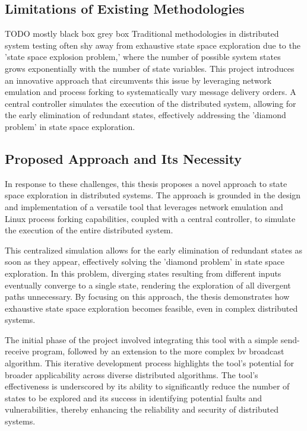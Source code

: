 \documentclass[a4paper,11pt,oneside]{report}
\begin{document}
\subsection{Limitations of Existing Methodologies}
TODO mostly black box grey box
Traditional methodologies in distributed system testing often shy away from exhaustive state space exploration due to the 'state space explosion problem,' where the number of possible system states grows exponentially with the number of state variables. This project introduces an innovative approach that circumvents this issue by leveraging network emulation and process forking to systematically vary message delivery orders. A central controller simulates the execution of the distributed system, allowing for the early elimination of redundant states, effectively addressing the 'diamond problem' in state space exploration.

\subsection{Proposed Approach and Its Necessity}
In response to these challenges, this thesis proposes a novel approach to state space exploration in distributed systems. The approach is grounded in the design and implementation of a versatile tool that leverages network emulation and Linux process forking capabilities, coupled with a central controller, to simulate the execution of the entire distributed system. 

This centralized simulation allows for the early elimination of redundant states as soon as they appear, effectively solving the 'diamond problem' in state space exploration. In this problem, diverging states resulting from different inputs eventually converge to a single state, rendering the exploration of all divergent paths unnecessary. By focusing on this approach, the thesis demonstrates how exhaustive state space exploration becomes feasible, even in complex distributed systems.

The initial phase of the project involved integrating this tool with a simple send-receive program, followed by an extension to the more complex bv broadcast algorithm. This iterative development process highlights the tool's potential for broader applicability across diverse distributed algorithms.
The tool's effectiveness is underscored by its ability to significantly reduce the number of states to be explored and its success in identifying potential faults and vulnerabilities, thereby enhancing the reliability and security of distributed systems.
\end{document}
